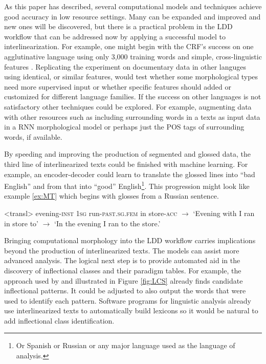 \documentclass[12pt]{article}
\begin{document}
As this paper has described, several computational models and techniques achieve good accuracy in low resource settings. Many can be expanded and improved and new ones will be discovered, but there is a practical problem in the LDD workflow that can be addressed now by applying a successful model to interlinearization. For example, one might begin with the CRF's success on one agglutinative language using only 3,000 training words and simple, cross-linguistic features \cite{moeller_automatic_2018}. Replicating the experiment on documentary data in other languges using identical, or similar features, would test whether some morphological types need more supervised input or whether specific features should added or customized for different language families. If the success on other languages is not satisfactory other techniques could be explored. For example, augmenting data with other resources such as including surrounding words in a texts as input data in a RNN morphological model or perhaps just the POS tags of surrounding words, if available. 

By speeding and improving the production of segmented and glossed data, the third line of interlinearized texts could be finished with machine learning. For example, an encoder-decoder could learn to translate the glossed lines into ``bad English'' and from that into ``good'' English\footnote{Or Spanish or Russian or any major language used as the language of analysis.}. This progression might look like example \ref{ex:MT} which begins with glosses from a Russian sentence.

\begin{singlespace}
\pex<transl> 
\label{ex:MT}
evening\textsc{-inst} \textsc{1sg} run\textsc{-past.sg.fem} in store\textsc{-acc} $\longrightarrow$ 
`Evening with I ran in store to' $\longrightarrow$
`In the evening I ran to the store.'
\xe
\end{singlespace}

Bringing computational morphology into the LDD workflow carries implications beyond the production of interlinearized texts. The models can assist more advanced analysis. The logical next step is to provide automated aid in the discovery of inflectional classes and their paradigm tables. For example, the approach used by  and illustrated in Figure \ref{fig:LCS} already finds candidate inflectional patterns. It could be adjusted to also output the words that were used to identify each pattern. Software programs for linguistic analysis already use interlinearized texts to automatically build lexicons so it would be natural to add inflectional class identification. 
\end{document}
